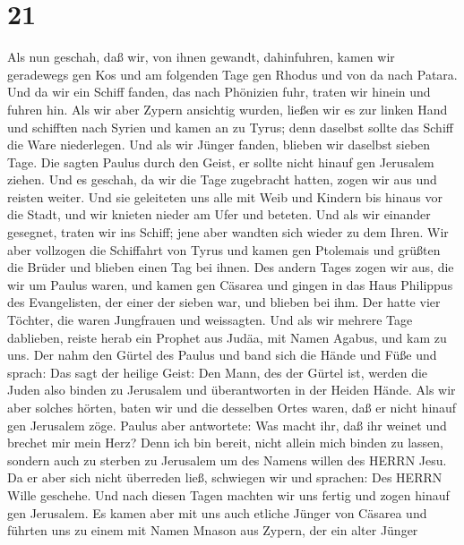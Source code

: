 \hypertarget{section-20}{%
\section{21}\label{section-20}}

 Als nun geschah, daß wir, von ihnen gewandt, dahinfuhren,
kamen wir geradewegs gen Kos und am folgenden Tage gen Rhodus und von da
nach Patara.  Und da wir ein Schiff fanden, das nach
Phönizien fuhr, traten wir hinein und fuhren hin.  Als wir
aber Zypern ansichtig wurden, ließen wir es zur linken Hand und
schifften nach Syrien und kamen an zu Tyrus; denn daselbst sollte das
Schiff die Ware niederlegen.  Und als wir Jünger fanden,
blieben wir daselbst sieben Tage. Die sagten Paulus durch den Geist, er
sollte nicht hinauf gen Jerusalem ziehen.  Und es geschah,
da wir die Tage zugebracht hatten, zogen wir aus und reisten weiter. Und
sie geleiteten uns alle mit Weib und Kindern bis hinaus vor die Stadt,
und wir knieten nieder am Ufer und beteten.  Und als wir
einander gesegnet, traten wir ins Schiff; jene aber wandten sich wieder
zu dem Ihren.  Wir aber vollzogen die Schiffahrt von Tyrus
und kamen gen Ptolemais und grüßten die Brüder und blieben einen Tag bei
ihnen.  Des andern Tages zogen wir aus, die wir um Paulus
waren, und kamen gen Cäsarea und gingen in das Haus Philippus des
Evangelisten, der einer der sieben war, und blieben bei ihm.
 Der hatte vier Töchter, die waren Jungfrauen und
weissagten.  Und als wir mehrere Tage dablieben, reiste
herab ein Prophet aus Judäa, mit Namen Agabus, und kam zu uns.
 Der nahm den Gürtel des Paulus und band sich die Hände und
Füße und sprach: Das sagt der heilige Geist: Den Mann, des der Gürtel
ist, werden die Juden also binden zu Jerusalem und überantworten in der
Heiden Hände.  Als wir aber solches hörten, baten wir und
die desselben Ortes waren, daß er nicht hinauf gen Jerusalem zöge.
 Paulus aber antwortete: Was macht ihr, daß ihr weinet und
brechet mir mein Herz? Denn ich bin bereit, nicht allein mich binden zu
lassen, sondern auch zu sterben zu Jerusalem um des Namens willen des
HERRN Jesu.  Da er aber sich nicht überreden ließ,
schwiegen wir und sprachen: Des HERRN Wille geschehe.  Und
nach diesen Tagen machten wir uns fertig und zogen hinauf gen Jerusalem.
 Es kamen aber mit uns auch etliche Jünger von Cäsarea und
führten uns zu einem mit Namen Mnason aus Zypern, der ein alter Jünger

